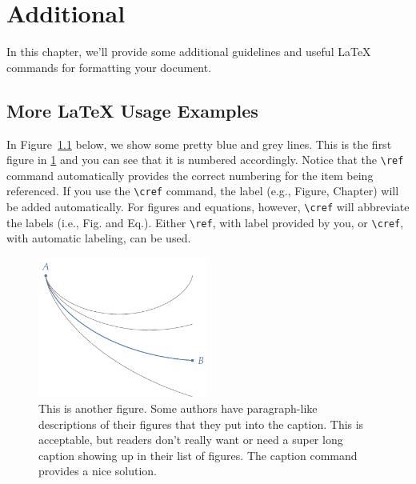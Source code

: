 \chapter{Additional \rmfamily{\LaTeX} }
\label{ch:ch2}

In this chapter, we'll provide some additional guidelines and useful \LaTeX{} commands for formatting your document.


\section{More {\rmfamily\LaTeX{}} Usage Examples}
In Figure~\ref{fig:brach2} below, we show some pretty blue and grey lines. This is the first figure in \cref{ch:ch2} and you can see that it is numbered accordingly. Notice that the \verb|\ref| command automatically provides the correct numbering for the item being referenced. If you use the \verb|\cref| command, the label (e.g., Figure, Chapter) will be added automatically. For figures and equations, however, \verb|\cref| will abbreviate the labels (i.e., Fig. and Eq.). Either \verb|\ref|, with label provided by you, or \verb|\cref|, with automatic labeling, can be used. 

\begin{figure}[htbp]
	\centering
	\includegraphics[width=2.2in]{figures/brachistochrone}
	\caption[Short caption to appear in list of figures.]{This is another figure. Some authors have paragraph-like descriptions of their figures that they put into the caption. This is acceptable, but readers don't really want or need a super long caption showing up in their list of figures. The {\ttfamily caption} command provides a nice solution.}
	\label{fig:brach2}
\end{figure}

